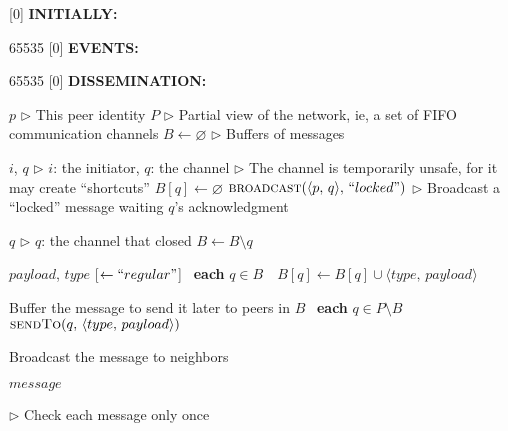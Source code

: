 
[0] {\textbf{INITIALLY:}}

{65535}{}
[0] {\textbf{EVENTS:}}

{65535}{}
[0] {\textbf{DISSEMINATION:}}


\newcommand{\comment}[1]{$\rhd$ #1}
\newcommand{\LINEIFTHEN}[2]{%
  \algorithmicif\ {#1}\ \algorithmicthen\ {#2} %
}
\newcommand{\LINEIFTHENELSE}[3]{%
  \algorithmicif\ {#1}\ \algorithmicthen\ {#2} \algorithmicelse\ {#3}%
}

\newcommand{\LINEFOR}[2]{%
  \algorithmicfor\ {#1}\ \algorithmicdo\ {#2} %
}

\begin{algorithmic}[1]

  \initially
  \State $p$ \hfill \comment{This peer identity}
  \State $P$
  \hfill \comment{Partial view of the network, ie, a set of FIFO communication channels}
  \State $B \leftarrow \varnothing$ 
  \hfill \comment{Buffers of messages}
  \endInitially
  
  \event
   {$i$, $q$}
  \hfill \comment{$i$: the initiator, $q$: the channel}
  \hfill \comment{The channel is temporarily unsafe, for it may create ``shortcuts''}  
  \State $B[q] \leftarrow \varnothing$
  \State $\textsc{broadcast}(\langle p,\, q\rangle,\, ``locked")$
  \hfill \comment{Broadcast a ``locked'' message waiting $q$'s acknowledgment}
  \EndIf
  \EndFunction
  
  \Statex

   {$q$} \hfill \comment{$q$: the channel that closed}
  \State $B \leftarrow B \setminus q$
  \EndFunction

  \endEvent

  \dissemination

   {$payload$, $type$ [$\leftarrow``regular"$]} 
  \State \LINEFOR{\textbf{each} $q \in B$}
  {$B[q] \leftarrow B[q] \cup \langle type,\, payload\rangle$}
  \hfill{Buffer the message to send it later to peers in $B$}
  \State \LINEFOR{\textbf{each} $q \in P \setminus B$} 
  {$\textsc{sendTo}(q,\, \langle type,\, payload \rangle)$}
  \hfill{Broadcast the message to neighbors}
  \EndFunction

  \Statex

   {$message$}

  \hfill \comment{Check each message only once}


\end{algorithmic}
